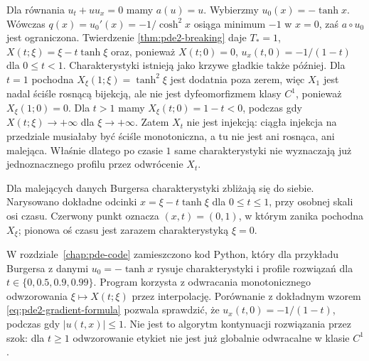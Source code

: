 \begin{przyklad}
\label{ex:pde2-burgers}
Dla równania $u_t+u u_x=0$ mamy $a(u)=u$.
Wybierzmy $u_0(x)=-\tanh x$. Wówczas
$q(x)=u_0'(x)=-1/\cosh^2x$ osiąga minimum $-1$
w $x=0$, zaś $a\circ u_0$ jest ograniczona.
Twierdzenie \ref{thm:pde2-breaking} daje $T_*=1$,
$X(t;\xi)=\xi-t\tanh\xi$ oraz, ponieważ $X(t;0)=0$,
$u_x(t,0)=-1/(1-t)$ dla $0\le t<1$.
Charakterystyki istnieją jako krzywe gładkie także
później. Dla $t=1$ pochodna $X_\xi(1;\xi)=\tanh^2\xi$
jest dodatnia poza zerem, więc $X_1$ jest nadal
ściśle rosnącą bijekcją, ale nie jest dyfeomorfizmem
klasy $C^1$, ponieważ $X_\xi(1;0)=0$.
Dla $t>1$ mamy $X_\xi(t;0)=1-t<0$, podczas gdy
$X(t;\xi)\to+\infty$ dla $\xi\to+\infty$.
Zatem $X_t$ nie jest injekcją: ciągła injekcja na
przedziale musiałaby być ściśle monotoniczna, a tu
nie jest ani rosnąca, ani malejąca.
Właśnie dlatego po czasie $1$ same charakterystyki
nie wyznaczają już jednoznacznego profilu przez odwrócenie
$X_t$.
\end{przyklad}

\begin{center}
\begin{minipage}{\linewidth}
\centering
{}
\par\smallskip\small
Dla malejących danych Burgersa charakterystyki
zbliżają się do siebie. Narysowano dokładne odcinki
$x=\xi-t\tanh\xi$ dla $0\leq t\leq1$, przy osobnej
skali osi czasu. Czerwony punkt oznacza $(x,t)=(0,1)$,
w którym zanika pochodna $X_\xi$; pionowa oś czasu
jest zarazem charakterystyką $\xi=0$.
\end{minipage}
\end{center}

\begin{uwaga}
W rozdziale~\ref{chap:pde-code} zamieszczono kod Python,
który dla przykładu Burgersa z danymi $u_0=-\tanh x$
rysuje charakterystyki i profile rozwiązań dla
$t\in\{0,0.5,0.9,0.99\}$. Program korzysta z odwracania
monotonicznego odwzorowania $\xi\mapsto X(t;\xi)$ przez
interpolację. Porównanie z dokładnym wzorem
\eqref{eq:pde2-gradient-formula} pozwala sprawdzić,
że $u_x(t,0)=-1/(1-t)$, podczas gdy $|u(t,x)|\leq1$.
Nie jest to algorytm kontynuacji rozwiązania przez szok:
dla $t\geq1$ odwzorowanie etykiet nie jest już globalnie
odwracalne w klasie $C^1$.
\end{uwaga}

